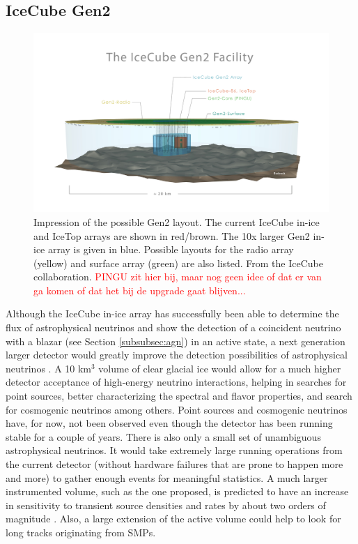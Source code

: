 \subsection{IceCube Gen2}
\begin{figure}[ht]
\centering
\includegraphics[width=\textwidth]{chapter5/img/gen2_structure.jpg}
\caption{Impression of the possible Gen2 layout. The current IceCube in-ice and IceTop arrays are shown in red/brown. The 10x larger Gen2 in-ice array is given in blue. Possible layouts for the radio array (yellow) and surface array (green) are also listed. From the IceCube collaboration. \textcolor{red}{PINGU zit hier bij, maar nog geen idee of dat er van ga komen of dat het bij de upgrade gaat blijven...}}
\label{fig:gen2}
\end{figure}

\noindent Although the IceCube in-ice array has successfully been able to determine the flux of astrophysical neutrinos and show the detection of a coincident neutrino with a blazar (see Section \ref{subsubsec:agn}) in an active state, a next generation larger detector would greatly improve the detection possibilities of astrophysical neutrinos \cite{Blaufuss:2015muc}. A 10 km$^3$ volume of clear glacial ice would allow for a much higher detector acceptance of high-energy neutrino interactions, helping in searches for point sources, better characterizing the spectral and flavor properties, and search for cosmogenic neutrinos among others. Point sources and cosmogenic neutrinos have, for now, not been observed even though the detector has been running stable for a couple of years. There is also only a small set of unambiguous astrophysical neutrinos. It would take extremely large running operations from the current detector (without hardware failures that are prone to happen more and more) to gather enough events for meaningful statistics. A much larger instrumented volume, such as the one proposed, is predicted to have an increase in sensitivity to transient source densities and rates by about two orders of magnitude \cite{Ahlers:2014ioa}. Also, a large extension of the active volume could help to look for long tracks originating from SMPs.

